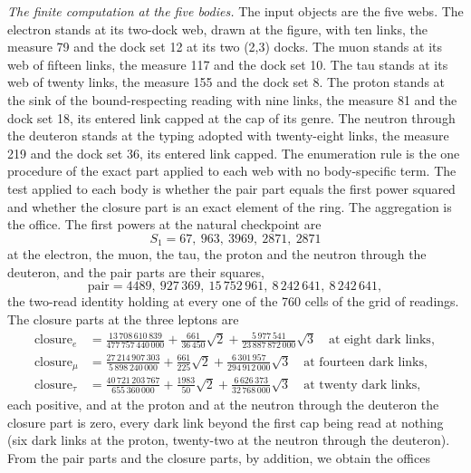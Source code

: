 \begin{chproof}
\textit{The finite computation at the five bodies.} The input objects are the five webs. The electron stands at its two-dock web, drawn at the figure, with ten links, the measure 79 and the dock set 12 at its two (2,3) docks. The muon stands at its web of fifteen links, the measure 117 and the dock set 10. The tau stands at its web of twenty links, the measure 155 and the dock set 8. The proton stands at the sink of the bound-respecting reading with nine links, the measure 81 and the dock set 18, its entered link capped at the cap of its genre. The neutron through the deuteron stands at the typing adopted with twenty-eight links, the measure 219 and the dock set 36, its entered link capped. The enumeration rule is the one procedure of the exact part applied to each web with no body-specific term. The test applied to each body is whether the pair part equals the first power squared and whether the closure part is an exact element of the ring. The aggregation is the office. The first powers at the natural checkpoint are
\begin{equation}
S_1=67,\ 963,\ 3969,\ 2871,\ 2871
\end{equation}
at the electron, the muon, the tau, the proton and the neutron through the deuteron, and the pair parts are their squares,
\begin{equation}
\mathrm{pair}=4489,\ 927\,369,\ 15\,752\,961,\ 8\,242\,641,\ 8\,242\,641 ,
\end{equation}
the two-read identity holding at every one of the 760 cells of the grid of readings. The closure parts at the three leptons are
\begin{align}
\mathrm{closure}_{e}&=\tfrac{13\,708\,610\,839}{477\,757\,440\,000}+\tfrac{661}{36\,450}\sqrt{2}+\tfrac{5\,977\,541}{23\,887\,872\,000}\sqrt{3}\quad\text{at eight dark links},\\
\mathrm{closure}_{\mu}&=\tfrac{27\,214\,907\,303}{5\,898\,240\,000}+\tfrac{661}{225}\sqrt{2}+\tfrac{6\,301\,957}{294\,912\,000}\sqrt{3}\quad\text{at fourteen dark links},\\
\mathrm{closure}_{\tau}&=\tfrac{40\,721\,203\,767}{655\,360\,000}+\tfrac{1983}{50}\sqrt{2}+\tfrac{6\,626\,373}{32\,768\,000}\sqrt{3}\quad\text{at twenty dark links},
\end{align}
each positive, and at the proton and at the neutron through the deuteron the closure part is zero, every dark link beyond the first cap being read at nothing (six dark links at the proton, twenty-two at the neutron through the deuteron). From the pair parts and the closure parts, by addition, we obtain the offices

\end{chproof}
